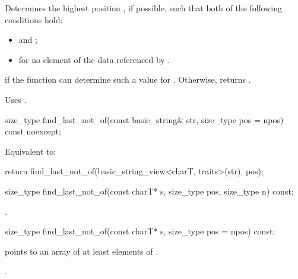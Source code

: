 \begin{itemdescr}
\pnum
\effects
Determines the highest position , if possible, such that both of
the following conditions hold:
\begin{itemize}
\item
{}
and
;
\item
{}%
for no element  of the data referenced by .
\end{itemize}

\pnum
\returns
{} if the function can determine such a value for .
Otherwise, returns
.

\pnum
\remarks
Uses
.
\end{itemdescr}

%
\begin{itemdecl}
size_type find_last_not_of(const basic_string& str, size_type pos = npos) const noexcept;
\end{itemdecl}

\begin{itemdescr}
\pnum
\effects
Equivalent to:
\begin{codeblock}
return find_last_not_of(basic_string_view<charT, traits>(str), pos);
\end{codeblock}
\end{itemdescr}

%
\begin{itemdecl}
size_type find_last_not_of(const charT* s, size_type pos, size_type n) const;
\end{itemdecl}

\begin{itemdescr}
\pnum
\returns
{}.
\end{itemdescr}

%
\begin{itemdecl}
size_type find_last_not_of(const charT* s, size_type pos = npos) const;
\end{itemdecl}

\begin{itemdescr}
\pnum
\requires {} points to an array of at least 
elements of .

\pnum
\returns
{}.
\end{itemdescr}

